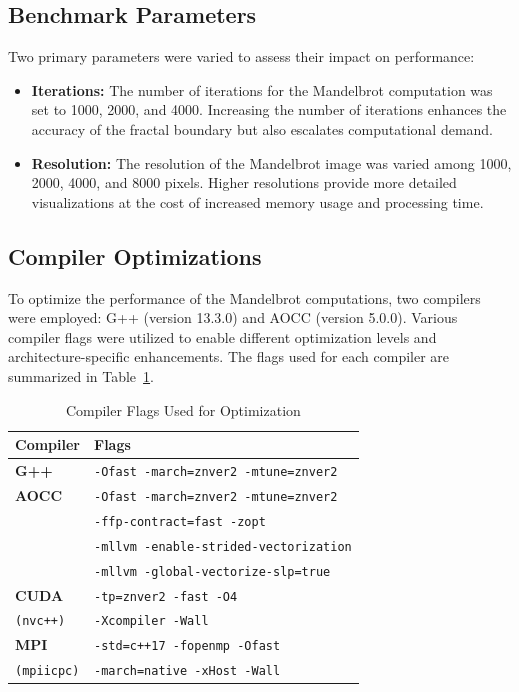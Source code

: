 \documentclass[
	report, %
	11pt, %
]{CSUniSchoolLabReport}
\newcounter{ct}
\begin{document}
\subsection{Benchmark Parameters}

Two primary parameters were varied to assess their impact on performance:

\begin{itemize}
	\item \textbf{Iterations:} The number of iterations for the Mandelbrot computation was set to 1000, 2000, and 4000. Increasing the number of iterations enhances the accuracy of the fractal boundary but also escalates computational demand.
	\item \textbf{Resolution:} The resolution of the Mandelbrot image was varied among 1000, 2000, 4000, and 8000 pixels. Higher resolutions provide more detailed visualizations at the cost of increased memory usage and processing time.
\end{itemize}

\subsection{Compiler Optimizations}

To optimize the performance of the Mandelbrot computations, two compilers were employed: G++ (version 13.3.0) and AOCC (version 5.0.0). Various compiler flags were utilized to enable different optimization levels and architecture-specific enhancements. The flags used for each compiler are summarized in Table~\ref{tab:compiler_flags}.

\begin{table}[H]
	\centering
	\begin{tabular}{lp{9cm}}
		\hline
		\textbf{Compiler}  & \textbf{Flags}                                \\
		\hline
		\textbf{G++}       & \texttt{-Ofast -march=znver2 -mtune=znver2}   \\
		\hline
		\textbf{AOCC}      & \texttt{-Ofast -march=znver2 -mtune=znver2}   \\
		                   & \texttt{-ffp-contract=fast -zopt}             \\
		                   & \texttt{-mllvm -enable-strided-vectorization} \\
		                   & \texttt{-mllvm -global-vectorize-slp=true}    \\
		\hline
		\textbf{CUDA}      & \texttt{-tp=znver2 -fast -O4}                 \\
		\texttt{(nvc++)}   & \texttt{-Xcompiler -Wall}                     \\
		\hline
		\textbf{MPI}       & \texttt{-std=c++17 -fopenmp -Ofast}           \\
		\texttt{(mpiicpc)} & \texttt{-march=native -xHost -Wall}           \\
		\hline
	\end{tabular}
	\caption{Compiler Flags Used for Optimization}
	\label{tab:compiler_flags}
\end{table}
\end{document}
